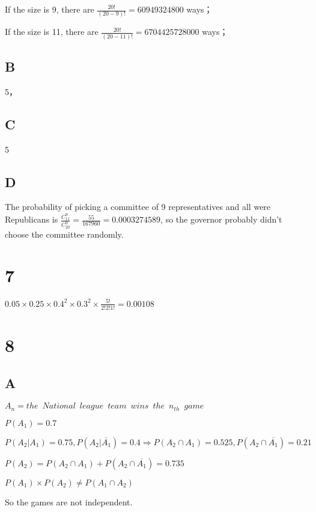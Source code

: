 \documentclass{article}
\begin{document}
	If the size is 9, there are $\frac{20!}{(20-9)!}=60949324800$
	 ways；
	
	If the size is 11, there are $\frac{20!}{(20-11)!}=　6704425728000$
	 ways；
	
	\subsection*{B}
	
	5，
	
	
	\subsection*{C}
	
	5
	
	\subsection*{D}
	
	The probability of picking a committee of 9 representatives and all were Republicans is $\frac{C^9_{11}}{C^9_{20}}=\frac{55}{167960}=0.0003274589$, so the governor probably didn't choose the committee randomly.
	
	\section*{7}
	
	$0.05\times 0.25\times 0.4^2\times 0.3^2\times 
	\frac{5!}{2!2!1!}=0.00108$
	
	\section*{8}
	
	\subsection*{A}	
	
	$A_n= the\enspace National\enspace league\enspace team\enspace wins\enspace the\enspace n_{th}\enspace game$
	
	$P(A_1)=0.7$
	
	$P(A_2|A_1)=0.75, P(A_2|\overline{A_1})=0.4\Rightarrow P(A_2\cap A_1)=0.525,P(A_2\cap\overline{A_1})=0.21$
	
	$P(A_2)=P(A_2 \cap A_1)+P(A_2\cap \overline{A_1})=0.735$
	
	$P(A_1)\times P(A_2)\ne P(A_1\cap A_2)$
	
	So the games are not independent.
	
\end{document}
